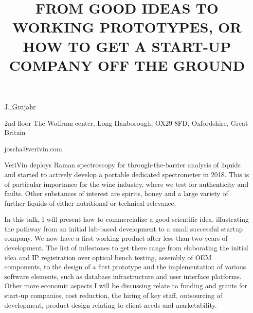 \title{FROM GOOD IDEAS TO WORKING PROTOTYPES, OR HOW TO GET A START-UP COMPANY OFF THE GROUND}

\underline{J. Gutjahr} 

{\normalsize{\vspace{-4mm}
2nd floor
The Wolfram center,
Long Hanborough,
OX29 8FD,
Oxfordshire,
Great Britain



\email joscha@verivin.com}}

VeriVin deploys Raman spectroscopy for through-the-barrier analysis of liquids and started to actively develop a portable dedicated spectrometer in 2018. This is of particular importance for the wine industry, where we test for authenticity and faults. Other substances of interest are spirits, honey and a large variety of further liquids of either nutritional or technical relevance.

In this talk, I will present how to commercialize a good scientific idea, illustrating the pathway from an initial lab-based development to a small successful startup company. We now have a first working product after less than two years of development. The list of milestones to get there range from elaborating the initial idea and IP registration over optical bench testing, assembly of OEM components, to the design of a first prototype and the implementation of various software elements, such as database infrastructure and user interface platforms. Other more economic aspects I will be discussing relate to funding and grants for start-up companies, cost reduction, the hiring of key staff, outsourcing of development, product design relating to client needs and marketability.

\vspace{\baselineskip}